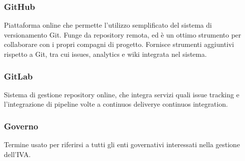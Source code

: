 \subsubsection*{GitHub}
Piattaforma online che permette l'utilizzo semplificato del sistema di versionamento Git. Funge da repository remota, ed è un ottimo strumento per collaborare con i propri compagni di progetto. Fornisce strumenti aggiuntivi rispetto a Git, tra cui issues, analytics e wiki integrata nel sistema.

\subsubsection*{GitLab}
Sistema di gestione repository online, che integra servizi quali issue tracking e l'integrazione di pipeline volte a continuos delivery\glosp e continuos integration\glo.

\subsubsection*{Governo}
Termine usato per riferirsi a tutti gli enti governativi interessati nella gestione dell'IVA.

